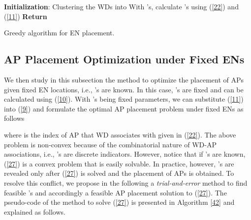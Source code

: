 \documentclass[journal, draftcls, one column, 12pt]{IEEEtran}
\begin{document}
\begin{algorithm}
\footnotesize
\SetAlgoLined

 \textbf{Initialization}:
  Clustering the WDs into  \;
  With 's, calculate 's using (\ref{22}) and (\ref{11})\;
\textbf{Return} 
\caption{Greedy algorithm for  EN placement.}
\label{41}
\end{algorithm}

\subsection{AP Placement Optimization under Fixed ENs}
We then study in this subsection the method to optimize the placement of APs given fixed EN locations, i.e., 's are known. In this case, 's are fixed and can be calculated using (\ref{10}). With 's being fixed parameters, we can substitute (\ref{11}) into (\ref{9}) and formulate the optimal AP placement problem under fixed ENs as follows

where  is the index of AP that WD  associates with given in (\ref{22}). The above problem is non-convex because of the combinatorial nature of WD-AP associations, i.e., 's are discrete indicators. However, notice that if 's are known, (\ref{27}) is a convex problem that is easily solvable. In practice, however, 's are revealed only after (\ref{27}) is solved and the placement of APs is obtained. To resolve this conflict, we propose in the following a \emph{trial-and-error} method to find feasible 's and accordingly a feasible AP placement solution to (\ref{27}). The pseudo-code of the method to solve (\ref{27}) is presented in Algorithm \ref{42} and explained as follows.
\end{document}

